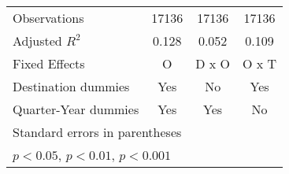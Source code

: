 \begin{table}[htbp]
\begin{tabular}{l*{3}{c}}
\hline
Observations        &       17136         &       17136         &       17136         \\
Adjusted \(R^{2}\)  &       0.128         &       0.052         &       0.109         \\
Fixed Effects       &           O         &       D x O         &       O x T         \\
Destination dummies &         Yes         &          No         &         Yes         \\
Quarter-Year dummies&         Yes         &         Yes         &          No         \\
\hline\hline
\multicolumn{4}{l}{\footnotesize Standard errors in parentheses}\\
\multicolumn{4}{l}{\footnotesize \sym{*} \(p<0.05\), \sym{**} \(p<0.01\), \sym{***} \(p<0.001\)}\\
\end{tabular}
\end{table}
